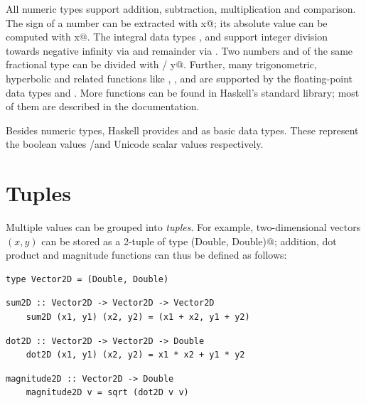 \documentclass[UdineBachThesis,american,11pt,draft]{PhdThesis}
\begin{document}
  All numeric types support addition, subtraction, multiplication and
  comparison. The sign of a number \lstinline@x@ can be extracted with
  \lstinline@signum x@; its absolute value can be computed with
  \lstinline@abs x@. The integral data types \lstinline@Int@, \lstinline@Word@
  and \lstinline@Integer@ support integer division towards negative infinity via
  \lstinline@div@ and remainder via \lstinline@mod@. Two numbers \lstinline@x@
  and \lstinline@y@ of the same fractional type can be divided with
  \lstinline@x / y@. Further, many trigonometric, hyperbolic and related
  functions like \lstinline@sin@, \lstinline@cos@, \lstinline@sqt@ and
  \lstinline@log@ are supported by the floating-point data types
  \lstinline@Float@ and \lstinline@Double@. More functions can be found in
  Haskell's standard library; most of them are described in the documentation.

  Besides numeric types, Haskell provides \lstinline@Bool@ and \lstinline@Char@
  as basic data types. These represent the boolean values
  \lstinline@True@/\lstinline@False@ and Unicode scalar values respectively.

  \section{Tuples}

  Multiple values can be grouped into \emph{tuples}. For example,
  two-dimensional vectors $\left(x, y\right)$ can be stored as a 2-tuple of type
  \lstinline@(Double, Double)@; addition, dot product and magnitude functions
  can thus be defined as follows:

  \begin{lstlisting}[gobble=4,basicstyle=\ttfamily\small]
    type Vector2D = (Double, Double)
  \end{lstlisting}

  \begin{lstlisting}[gobble=4,basicstyle=\ttfamily\small]
    sum2D :: Vector2D -> Vector2D -> Vector2D
    sum2D (x1, y1) (x2, y2) = (x1 + x2, y1 + y2)
  \end{lstlisting}

  \begin{lstlisting}[gobble=4,basicstyle=\ttfamily\small]
    dot2D :: Vector2D -> Vector2D -> Double
    dot2D (x1, y1) (x2, y2) = x1 * x2 + y1 * y2
  \end{lstlisting}

  \begin{lstlisting}[gobble=4,basicstyle=\ttfamily\small]
    magnitude2D :: Vector2D -> Double
    magnitude2D v = sqrt (dot2D v v)
  \end{lstlisting}
\end{document}
